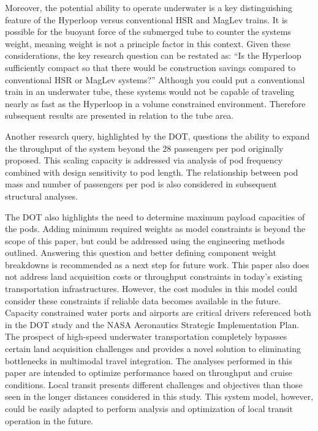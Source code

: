     Moreover, the potential ability to operate underwater is a key distinguishing feature
    of the Hyperloop versus conventional HSR and MagLev trains. It is possible for the buoyant force
    of the submerged tube to counter the systems weight, meaning weight is not
    a principle factor in this context.
    Given these considerations, the key research
    question can be restated as: ``Is the Hyperloop sufficiently compact so
    that there would be construction savings compared to conventional
    HSR or MagLev systems?'' Although you could put a conventional train in an
    underwater tube, these systems would not be capable of traveling nearly as
    fast as the Hyperloop in a volume constrained environment.
    Therefore subsequent results are presented in relation to the tube area.

    Another research query, highlighted by the DOT, questions the ability to
    expand the throughput of the system beyond the 28 passengers per pod
    originally proposed. This scaling capacity is addressed
    via analysis of pod frequency combined with design sensitivity to pod length.
    The relationship between pod mass and number of passengers per pod is also
    considered in subsequent structural analyses.

    The DOT also highlights the need to determine maximum payload capacities
    of the pods. Adding minimum required weights as model constraints is beyond the scope of
    this paper, but could be addressed using the engineering methods outlined.
    Answering this question and better defining component weight breakdowns
    is recommended as a next step for future work.
    This paper also does not address land acquisition costs or throughput
    constraints in today's existing transportation infrastructures.
    However, the cost modules in this model could consider these constraints if
    reliable data becomes available in the future.
    Capacity constrained water ports and airports are critical drivers referenced
    both in the DOT study and the NASA Aeronautics Strategic
    Implementation Plan. The prospect of high-speed underwater transportation
    completely bypasses certain land acquisition challenges and provides a novel solution
    to eliminating bottlenecks in multimodal travel integration. The analyses performed in this paper
    are intended to optimize performance based on throughput and cruise conditions.
    Local transit presents different challenges and objectives than those seen in the longer distances
    considered in this study. This system model, however, could be easily adapted to perform
    analysis and optimization of local transit operation in the future.


